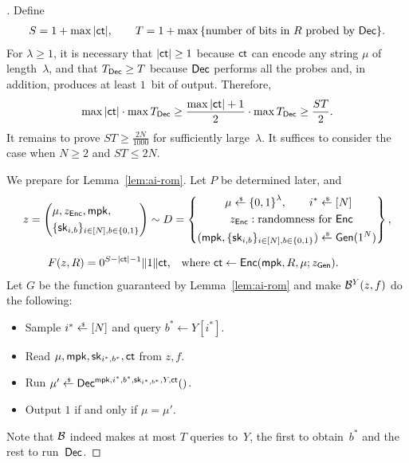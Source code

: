 \begin{proof}[]
Define
\begin{align*}
S=1+\max{|\ct|},\qquad
T=1+\max{\{\textup{number of bits in $R$ probed by $\Dec$}\}}.
\end{align*}
For ${\lambda\geq 1}$, it is necessary
that ${|\ct|\geq 1}$ because $\ct$ can encode any string $\mu$ of length~$\lambda$, and
that ${\TDec\geq T}$ because $\Dec$ performs all the probes and, in addition, produces at least $1$~bit of output.
Therefore,
\begin{align*}
\max{|\ct|}\cdot\max{\TDec}
\geq\frac{\max{|\ct|}+1}{2}\cdot\max{\TDec}
\geq\frac{ST}{2}.
\end{align*}
It remains to prove ${ST\geq\frac{2N}{1000}}$ for sufficiently large~$\lambda$.
It suffices to consider the case when ${N\geq 2}$ and ${ST\leq 2N}$.

We prepare for Lemma~\ref{lem:ai-rom}.
Let $P$ be determined later, and
\begin{align*}
z&{}=\left(\begin{aligned}
&\mu,z_\Enc,\mpk,\\
&\{\sk_{i,b}\}_{i\in[N],b\in\bit}
\end{aligned}\right)\sim D=
\left\{\begin{aligned}
\mu\draws\bit^\lambda,\qquad
i^\ast\draws{}&[N]\\
z_\Enc:\textup{randomness for }&\Enc\\
(\mpk,\{\sk_{i,b}\}_{i\in[N],b\in\bit})\draws{}&\Gen(1^N)
\end{aligned}\right\},\\
\rule[1.5em]{0pt}{0pt}
F(z,R)
\hspace*{-5em}&\hspace*{5em}
{}=0^{S-|\ct|-1}\concat 1\concat\ct\textup{,\quad where }
\ct\gets\Enc(\mpk,R,\mu;z_\Gen).
\end{align*}
Let $G$ be the function guaranteed by Lemma~\ref{lem:ai-rom} and make
${\mathcal{B}}^Y(z,f)$ do the following:
\begin{itemize}
\item Sample ${i^\ast\draws[N]}$ and query ${b^\ast\gets Y[i^\ast]}$.
\item Read $\mu,\mpk,\sk_{i^\ast,b^\ast},\ct$ from $z,f$.
\item Run ${\mu'\draws\Dec^{\mpk,i^\ast,b^\ast,\sk_{i^\ast,b^\ast},Y,\ct}()}$.
\item Output $1$ if and only if ${\mu=\mu'}$.
\end{itemize}
Note that ${\mathcal{B}}$ indeed makes at most $T$ queries to~$Y$,
the first to obtain~$b^\ast$ and the rest to run~$\Dec$.


\end{proof}
